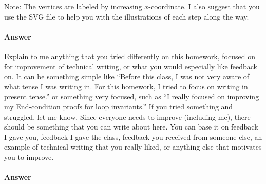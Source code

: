 \documentclass{article}
\begin{document}
Note:
The vertices are labeled by increasing $x$-coordinate.  I also suggest that you
use the SVG file to help you with the illustrations of each step along the way.

\paragraph{Answer}



\collab{\todo{}}

Explain to me anything that you tried differently on this homework, focused on
for improvement of technical writing, or what you would especially like feedback
on.  It can be something simple like ``Before this class, I was not very aware
of what tense I was writing in.  For this homework, I tried to focus on writing
in present tense.'' or something very focused, such as ``I really focused on
improving my End-condition proofs for loop invariants.''  If you tried something
and struggled, let me know. Since everyone needs to improve (including me),
there should be something that you can write about here.  You can base it on
feedback I gave you, feedback I gave the class, feedback you received from
someone else, an example of technical writing that you really liked, or anything
else that motivates you to improve.

\paragraph{Answer}

\end{document}
